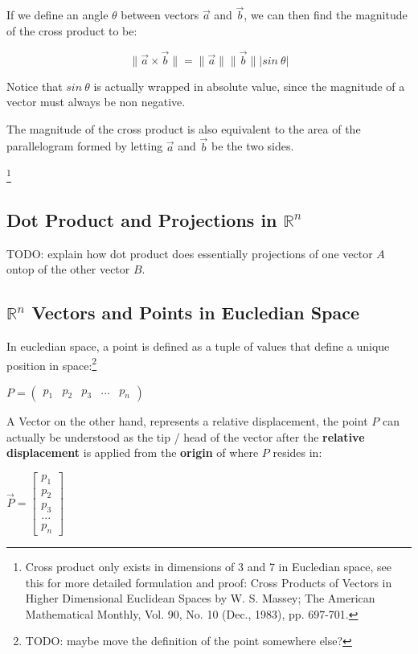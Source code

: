 \sgap
\begin{samepage}
    If we define an angle $\theta$ between vectors $\vec{a}$ and $\vec{b}$, we can then find the magnitude of the cross product to be:
    \begin{center}
        \[
            {\|\vec{a}} \times {\vec{b}\|}=\|\vec{a}\|\|\vec{b}\| \lvert sin~\theta \rvert 
        \]
    \end{center}

    Notice that $sin~\theta$ is actually wrapped in absolute value, since the magnitude of a vector
    must always be non negative.

    The magnitude of the cross product is also equivalent to the area of the parallelogram formed by letting $\vec{a}$ and $\vec{b}$ be the two sides.

    \footnote{
        Cross product only exists in dimensions of 3 and 7 in Eucledian space, see this for more detailed formulation and proof:
        Cross Products of Vectors in Higher Dimensional Euclidean Spaces by W. S. Massey;
        The American Mathematical Monthly, Vol. 90, No. 10 (Dec., 1983), pp. 697-701.
    }
\end{samepage}

\subsection{Dot Product and Projections in $\mathbb{R}^n$}
TODO: explain how dot product does essentially projections of one vector $A$ ontop of the other vector $B$.



\subsection{$\mathbb{R}^n$ Vectors and Points in Eucledian Space}
In eucledian space, a point is defined as a tuple of values that define a unique position in space:\footnote{TODO: maybe move the definition of the point somewhere else?}
\begin{center}
    $P=\begin{pmatrix}p_1 & p_2 & p_3 & ... & p_n\end{pmatrix}$
\end{center}

A Vector on the other hand, represents a relative displacement, the point $P$ can actually be understood as the tip / head of the vector
after the \textbf{relative displacement} is applied from the \textbf{origin} of where $P$ resides in:
\begin{center}
    $\vec{P}=\begin{bmatrix}p_1 \\ p_2 \\ p_3 \\ ... \\ p_n\end{bmatrix}$
\end{center}

